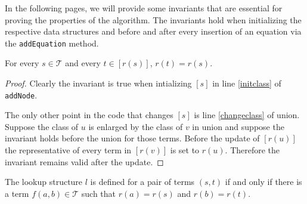 











In the following pages, we will provide some invariants that are essential for proving the properties of the algorithm.
The invariants hold when initializing the respective data structures and before and after every insertion of an equation via the \texttt{addEquation} method.

\begin{invariant}[Class]

For every $s \in \mathcal{T}$ and every $t \in [r(s)]$, $r(t) = r(s)$.

\label{invar:class}
\end{invariant}
\begin{proof}

Clearly the invariant is true when intializing $[s]$ in line \ref{initclass} of \texttt{addNode}.

The only other point in the code that changes $[s]$ is line \ref{changeclass} of union.
Suppose the class of $u$ is enlarged by the class of $v$ in union and suppose the invariant holds before the union for those terms.
Before the update of $[r(u)]$ the representative of every term in $[r(v)]$ is set to $r(u)$.
Therefore the invariant remains valid after the update.

\end{proof}

\begin{invariant}[Lookup]

The lookup structure $l$ is defined for a pair of terms $(s,t)$ if and only if there is a term $f(a,b) \in \mathcal{T}$ such that $r(a) = r(s)$ and $r(b) = r(t)$.

\end{invariant}

